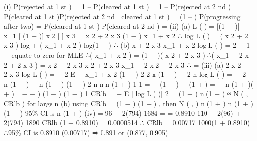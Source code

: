 \documentclass[a4paper,12pt]{article}
\begin{document}
(i) P(rejected at 1 st ) = 1 – P(cleared at 1 st ) = 1 – \theta
P(rejected at 2 nd ) = P(cleared at 1 st )P(rejected at 2 nd | cleared at 1 st )
= \theta (1 – \theta)
P(progressing after two) = P(cleared at 1 st ) P(cleared at 2 nd ) = 
(ii)
(a)
L ( \theta ) = [(1 − \theta )] x_1 [ \theta (1 − \theta )] x 2 [  ] x 3
= \theta x 2 + 2 x 3 (1 − \theta ) x_1 + x 2
∴ log L ( \theta ) = ( x 2 + 2 x 3 ) log \theta + ( x_1 + x 2 ) log(1 − \theta )
∴
(b)
x + 2 x 3 x_1 + x 2
\frac{\partial}{\partial} 
log L ( \theta ) = 2
−
1 − \theta
\frac{\partial}{\partial} \theta
\theta
equate to zero for MLE
∴\theta ( x_1 + x 2 ) = (1 − \theta )( x 2 + 2 x 3 )
∴\theta ( x_1 + 2 x 2 + 2 x 3 ) = x 2 + 2 x 3
x 2 + 2 x 3
x_1 + 2 x 2 + 2 x 3
∴\hat{\theta} =
(iii)
(a)
\frac{\partial}{\partial}  2 x 2 + 2 x 3
\frac{\partial}{\partial} \theta {}
log L ( \theta ) = −
2
E {
−
x_1 + x 2
(1 − \theta ) 2
\frac{\partial}{\partial}  2 n \theta (1 − \theta ) + 2 n 
\frac{\partial}{\partial} \theta {}
log L ( \theta )} = −
2
−
n (1 − \theta ) + n \theta (1 − \theta )
(1 − \theta ) 2
n
n
n (1 + \theta )
1
1
= − (1 + \theta ) −
(1 + \theta ) = − n (1 + \theta )( +
) =−
\theta
{} − \theta )
\theta (1 − \theta )
(1 − \theta )
1
CRlb =
− E [
\frac{\partial}{\partial} 
log L ( \theta )]
\frac{\partial}{\partial} 
2
=
\theta (1 − \theta )
n (1 + \theta )
\hat{\theta} ≈ N ( \theta , CRlb ) for large n
(b)
using CRlb =
\hat{\theta} (1 − \hat{\theta} )
\hat{\theta} (1 − \hat{\theta} )
, then \hat{\theta} \approx N ( \theta ,
)
n (1 + \hat{\theta} )
n (1 + \hat{\theta} )
\hat{\theta} (1 − \hat{\theta} )
95\% CI is \hat{\theta} 
n (1 + \hat{\theta} )
(iv)
\hat{\theta} =
96 + 2(794)
1684
=
= 0.8910
110 + 2(96) + 2(794) 1890
CRlb (1 − 0.8910)
= 0.0000514 ∴ CRlb = 0.00717
1000(1 + 0.8910)
∴95\% CI is 0.8910 (0.00717)
⇒ 0.891  or (0.877, 0.905)
\end{document}
